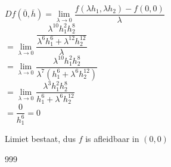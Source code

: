\documentclass[a4paper]{article}
\begin{document}
$Df(\overline{0}, \overline{h}) = \lim\limits_{\lambda \rightarrow 0} \dfrac{f(\lambda h_1, \lambda h_2) - f(0,0)}{\lambda}$\\

$= \lim\limits_{\lambda \rightarrow 0} \dfrac{\dfrac{\lambda^{10} h_1^2 h_2^8}{\lambda^6 h_1^6+\lambda^{12}h_2^{12}}}{\lambda}$\\

$=  \lim\limits_{\lambda \rightarrow 0} \dfrac{\lambda^{10} h_1^2 h_2^8}{\lambda^7 \left(h_1^6+\lambda^6h_2^{12}\right)}$\\

$=  \lim\limits_{\lambda \rightarrow 0} \dfrac{\lambda^{3} h_1^2 h_2^8}{h_1^6+\lambda^6h_2^{12}}$\\

$= \dfrac{0}{h_1^6}=0$

Limiet bestaat, dus $f$ is afleidbaar in $(0,0)$\\


\begin{thebibliography}{999}
\end{thebibliography}
\end{document}
